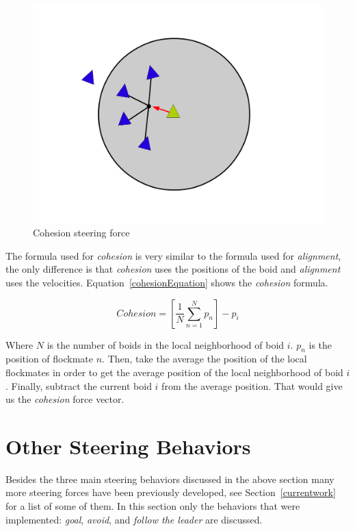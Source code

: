 \begin{figure}[htbp]
\begin{center}
\includegraphics[scale=0.3]{figures/cohesion.pdf}
\caption{Cohesion steering force}
\label{cohesionPDF}
\end{center}
\end{figure}

The formula used for \textit{cohesion} is very similar to the formula used for \textit{alignment}, the only difference is that \textit{cohesion} uses the positions of the boid and \textit{alignment} uses the velocities. Equation~\ref{cohesionEquation} shows the \textit{cohesion} formula.

\begin{equation}
\label{cohesionEquation}
Cohesion = \left[  \frac{1}{N} \sum_{n=1}^{N} p_n \right ] - p_i
\end{equation}

Where $N$ is the number of boids in the local neighborhood of boid $i$. $p_n$ is the position of flockmate $n$. Then, take the average the position of the local flockmates in order to get the average position of the local neighborhood of boid $i$. Finally, subtract the current boid $i$ from the average position. That would give us the \textit{cohesion} force vector.

\section{Other Steering Behaviors}\label{otherbehaviors}
Besides the three main steering behaviors discussed in the above section many more steering forces have been previously developed, see Section~\ref{currentwork} for a list of some of them. In this section only the behaviors that were implemented: \textit{goal}, \textit{avoid}, and \textit{follow the leader} are discussed.

